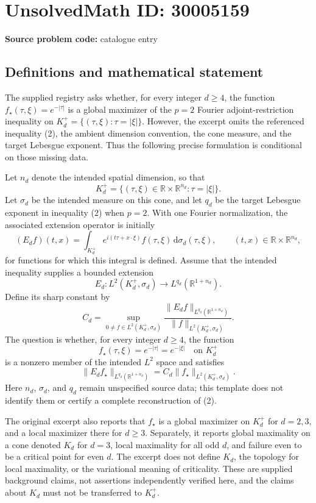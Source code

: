 \documentclass[11pt]{article}
\newcommand{\R}{\mathbb{R}}
\begin{document}
\section*{UnsolvedMath ID: 30005159}
\textbf{Source problem code:} catalogue entry
\subsection{Definitions and mathematical statement}
The supplied registry asks whether, for every integer \(d\geq4\), the function \(f_\star(\tau,\xi)=e^{-|\tau|}\) is a global maximizer of the \(p=2\) Fourier adjoint-restriction inequality on \(K_d^+=\{(\tau,\xi):\tau=|\xi|\}\). However, the excerpt omits the referenced inequality (2), the ambient dimension convention, the cone measure, and the target Lebesgue exponent. Thus the following precise formulation is conditional on those missing data.

Let \(n_d\) denote the intended spatial dimension, so that
\[
K_d^+=\{(\tau,\xi)\in\R\times\R^{n_d}:\tau=|\xi|\}.
\]
Let \(\sigma_d\) be the intended measure on this cone, and let \(q_d\) be the target Lebesgue exponent in inequality (2) when \(p=2\). With one Fourier normalization, the associated extension operator is initially
\[
(E_d f)(t,x)=\int_{K_d^+} e^{i(t\tau+x\cdot\xi)}f(\tau,\xi)\,\mathrm d\sigma_d(\tau,\xi),
\qquad (t,x)\in\R\times\R^{n_d},
\]
for functions for which this integral is defined. Assume that the intended inequality supplies a bounded extension
\[
E_d:L^2(K_d^+,\sigma_d)\longrightarrow L^{q_d}(\R^{1+n_d}).
\]
Define its sharp constant by
\[
C_d=\sup_{0\ne f\in L^2(K_d^+,\sigma_d)}
\frac{\|E_d f\|_{L^{q_d}(\R^{1+n_d})}}
{\|f\|_{L^2(K_d^+,\sigma_d)}}.
\]
The question is whether, for every integer \(d\geq4\), the function
\[
f_\star(\tau,\xi)=e^{-|\tau|}=e^{-|\xi|}\quad\text{on }K_d^+
\]
is a nonzero member of the intended \(L^2\) space and satisfies
\[
\|E_d f_\star\|_{L^{q_d}(\R^{1+n_d})}
=C_d\|f_\star\|_{L^2(K_d^+,\sigma_d)}.
\]
Here \(n_d\), \(\sigma_d\), and \(q_d\) remain unspecified source data; this template does not identify them or certify a complete reconstruction of (2).

The original excerpt also reports that \(f_\star\) is a global maximizer on \(K_d^+\) for \(d=2,3\), and a local maximizer there for \(d\geq3\). Separately, it reports global maximality on a cone denoted \(K_d\) for \(d=3\), local maximality for all odd \(d\), and failure even to be a critical point for even \(d\). The excerpt does not define \(K_d\), the topology for local maximality, or the variational meaning of criticality. These are supplied background claims, not assertions independently verified here, and the claims about \(K_d\) must not be transferred to \(K_d^+\).
\end{document}
